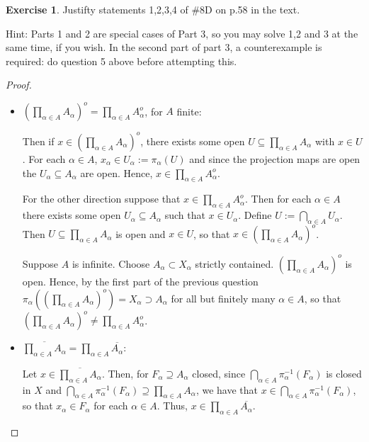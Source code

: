 \documentclass[12pt]{extarticle}
\newcommand{\<}{\langle}
\renewcommand{\>}{\rangle}
\theoremstyle{definition}
\newtheorem{exercise}{Exercise}
\begin{document}
\begin{exercise}
  Justifty statements 1,2,3,4 of \#8D on p.58 in the text.

  Hint: Parts 1 and 2 are special cases of Part 3, so you may solve 1,2 and 3 at the same time, if you wish. In the second part of part 3, a counterexample is required: do question 5 above before attempting this. 
\end{exercise}
\begin{proof}
  \begin{itemize}
  \item $(\prod\limits_{\alpha \in A} A_{\alpha})^o = \prod\limits_{\alpha \in A} A_{\alpha}^o$, for $A$ finite:
    
    Then if $x \in (\prod\limits_{\alpha \in A} A_{\alpha})^o$, there exists some open $U \subseteq \prod\limits_{\alpha \in A} A_{\alpha} $ with $x \in U$.
    For each $\alpha \in A$, $x_{\alpha} \in U_{\alpha} := \pi_{\alpha}(U)$ and since the projection maps are open the $U_{\alpha} \subseteq A_{\alpha}$ are open.
    Hence, $x \in \prod\limits_{\alpha \in A} A_{\alpha}^o$.

    For the other direction suppose that $x \in \prod\limits_{\alpha \in A} A_{\alpha}^o$.
    Then for each $\alpha \in A$ there exists some open $U_\alpha \subseteq A_{\alpha}$ such that $x \in U_{\alpha}$.
    Define $U:= \bigcap\limits_{\alpha \in A} U_{\alpha}$. Then $U \subseteq \prod\limits_{\alpha \in A} A_{\alpha}$ is open and $x \in U$, so that $x \in (\prod\limits_{\alpha \in A} A_{\alpha})^o$.

    Suppose $A$ is infinite. Choose $A_{\alpha} \subset X_{\alpha}$ strictly contained. $(\prod\limits_{\alpha \in A} A_{\alpha})^o$ is open. Hence, by the first part of the previous question
    $\pi_{\alpha}((\prod\limits_{\alpha \in A} A_{\alpha})^o) = X_{\alpha} \supset A_{\alpha}$ for all but finitely many $\alpha \in A$, so that $(\prod\limits_{\alpha \in A} A_{\alpha})^o \neq \prod\limits_{\alpha \in A} A_{\alpha}^o$.
    
  \item $\overline{\prod\limits_{\alpha \in A} A_{\alpha}} = \prod\limits_{\alpha \in A} \overline{A_{\alpha}}$:
    
    Let $x \in \overline{\prod\limits_{\alpha \in A} A_{\alpha}}$. Then, for $F_\alpha \supseteq A_\alpha$ closed, since $ \bigcap\limits_{\alpha \in A} \pi_{\alpha}^{-1}(F_{\alpha})$ is closed in $X$
    and $\bigcap\limits_{\alpha \in A} \pi_{\alpha}^{-1}(F_{\alpha}) \supseteq \prod\limits_{\alpha \in A} A_{\alpha}$, we have that 
    $x \in \bigcap\limits_{\alpha \in A} \pi_{\alpha}^{-1}(F_{\alpha})$, so that $x_{\alpha} \in F_{\alpha}$ for each $\alpha \in A$. Thus, $x \in \prod\limits_{\alpha \in A} \overline{A_{\alpha}}$.


\end{itemize}
\end{proof}
\end{document}
